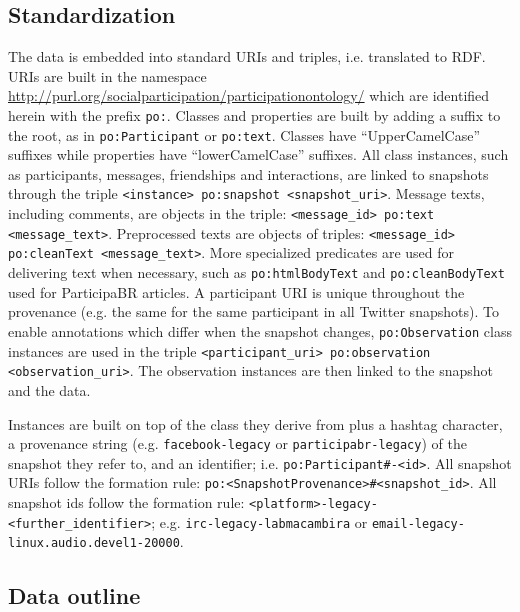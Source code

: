 \documentclass[review]{elsarticle}
\newcommand{\textttt}[1] {\texttt{\footnotesize#1}}
\begin{document}
\subsection{Standardization}
The data is embedded into standard URIs and triples, i.e. translated to RDF.
URIs are built in the namespace \url{http://purl.org/socialparticipation/participationontology/}
which are identified herein with the prefix \textttt{po:}.
Classes and properties are built by adding a suffix to the root, as in \textttt{po:Participant} or \textttt{po:text}.
Classes have ``UpperCamelCase'' suffixes while properties have ``lowerCamelCase'' suffixes.
All class instances, such as participants, messages, friendships and
interactions, are linked to
snapshots through the triple \textttt{<instance> po:snapshot <snapshot\_uri>}.
Message texts, including comments, are objects in the triple: \textttt{<message\_id> po:text <message\_text>}.
Preprocessed texts are objects of triples: \textttt{<message\_id> po:cleanText <message\_text>}.
More specialized predicates are used for delivering text when necessary,
such as \textttt{po:htmlBodyText} and \textttt{po:cleanBodyText} used
for ParticipaBR articles.
A participant URI is unique throughout the provenance (e.g. the same for
the same participant in all Twitter snapshots).
To enable annotations which differ when the snapshot changes,
\texttt{po:Observation} class instances are used in the triple
\textttt{<participant\_uri> po:observation <observation\_uri>}.
The observation instances are then linked to the snapshot and the
data.

Instances are built on top of the class they derive from plus a hashtag character,
a provenance string (e.g. \textttt{facebook-legacy} or
\textttt{participabr-legacy}) of the snapshot they refer to, and an identifier;
i.e. \textttt{po:Participant\#<provenance-legacy>-<id>}.
All snapshot URIs follow the formation rule: \textttt{po:<SnapshotProvenance>\#<snapshot\_id>}.
All snapshot ids follow the formation rule: \textttt{<platform>-legacy-<further\_identifier>}; e.g.
\textttt{irc-legacy-labmacambira} or
\textttt{email-legacy-linux.audio.devel1-20000}.

\subsection{Data outline}




\end{document}
